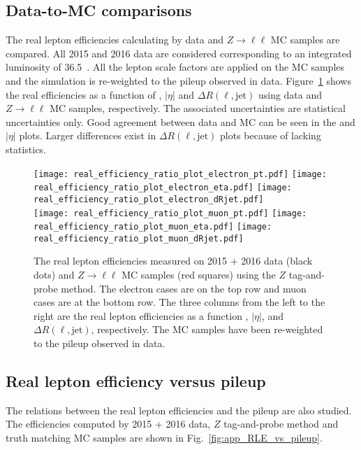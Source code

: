 
\subsection{Data-to-MC comparisons}
\label{subsec:app_RLE_data_to_mc_comparisons}
The real lepton efficiencies calculating by data and $Z\to \ell\ell$ MC samples are compared.
All 2015 and 2016 data are considered corresponding to an integrated luminosity of 36.5~\ifb.
All the lepton scale factors are applied on the MC samples and the simulation is re-weighted to the pileup observed in data.
Figure~\ref{fig:app_RLE_real_efficiency_pt_eta_dRjet} shows the real efficiencies as a function of \pt, $|\eta|$ and $\Delta R(\ell, \mathrm{jet})$ using data and $Z\to \ell \ell$ MC samples, respectively.
The associated uncertainties are statistical uncertainties only.
Good agreement between data and MC can be seen in the \pt and $|\eta|$ plots.
Larger differences exist in $\Delta R(\ell, \mathrm{jet})$ plots because of lacking statistics.

\begin{figure}[htb]
    \texttt{[image: real\_efficiency\_ratio\_plot\_electron\_pt.pdf]}
    \texttt{[image: real\_efficiency\_ratio\_plot\_electron\_eta.pdf]}
    \texttt{[image: real\_efficiency\_ratio\_plot\_electron\_dRjet.pdf]}\\
    \texttt{[image: real\_efficiency\_ratio\_plot\_muon\_pt.pdf]}
    \texttt{[image: real\_efficiency\_ratio\_plot\_muon\_eta.pdf]}
    \texttt{[image: real\_efficiency\_ratio\_plot\_muon\_dRjet.pdf]}
    \caption{The real lepton efficiencies measured on 2015 + 2016 data (black dots) and $Z\to \ell\ell$ MC samples (red squares) using the $Z$ tag-and-probe method.
    The electron cases are on the top row and muon cases are at the bottom row.
    The three columns from the left to the right are the real lepton efficiencies as a function \pt, $|\eta|$, and $\Delta R(\ell, \mathrm{jet})$, respectively.
    The MC samples have been re-weighted to the pileup observed in data.}
    \label{fig:app_RLE_real_efficiency_pt_eta_dRjet}
\end{figure}


\subsection{Real lepton efficiency versus pileup}
\label{subsec:app_RLE_vs_pileup}
The relations between the real lepton efficiencies and the pileup are also studied.
The efficiencies computed by 2015 + 2016 data, $Z$ tag-and-probe method and truth matching MC samples are shown in Fig.~\ref{fig:app_RLE_vs_pileup}.

